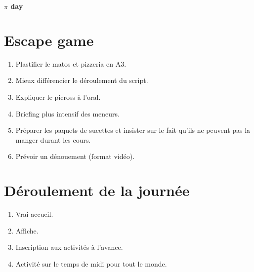 \documentclass[parskip=half-]{scrartcl}
\begin{document}
\begin{Huge}
    \bfseries\boldmath
    \(\pi\) day
\end{Huge}
    \section*{Escape game}
    \begin{enumerate}
        \item Plastifier le matos et pizzeria en A3.
        \item Mieux différencier le déroulement du script.
        \item Expliquer le picross à l'oral.
        \item Briefing plus intensif des meneurs.
        \item Préparer les paquets de sucettes et insister sur le fait qu'ils ne peuvent pas la manger durant les cours.
        \item Prévoir un dénouement (format vidéo).
    \end{enumerate}

    \section*{Déroulement de la journée}
    \begin{enumerate}
        \item Vrai accueil.
        \item Affiche.
        \item Inscription aux activités à l'avance.
        \item Activité sur le temps de midi pour tout le monde.
    \end{enumerate}
\end{document}
